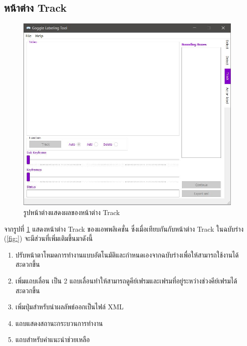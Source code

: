 \subsection*{หน้าต่าง Track}
\begin{figure}[!ht]
  \centering
    \includegraphics[scale=0.65]{chapter4/images/Final_ui/Track.jpg}
    \caption{รูปหน้าต่างแสดงผลของหน้าต่าง Track}
    \label{fig:final_track}
\end{figure}
จากรูปที่ \ref{fig:final_track} แสดงหน้าต่าง Track ของแอพพลิเคชั่น ซึ่งเมื่อเทียบกันกับหน้าต่าง Track ในฉบับร่าง (\ref{fig:}) จะมีส่วนที่เพิ่มเติมขึ้นมาดังนี้
\begin{enumerate}
	\item ปรับหน้าตาโหมดการทำงานแบบอัตโนมัติและกำหนดเองจากฉบับร่างเพื่อให้สามารถใช้งานได้สะดวกขึ้น
	\item เพิ่มแถบเลื่อน เป็น 2 แถบเลื่อนทำให้สามารถดูคีย์เฟรมและเฟรมที่อยู่ระหว่างช่วงคีย์เฟรมได้สะดวกขึ้น
	\item เพิ่มปุ่มสำหรับนำผลลัพธ์ออกเป็นไฟล์ XML 
	\item แถบแสดงสถานะกระบวนการทำงาน
	\item แถบสำหรับคำแนะนำช่วยเหลือ
\end{enumerate}		

\clearpage
